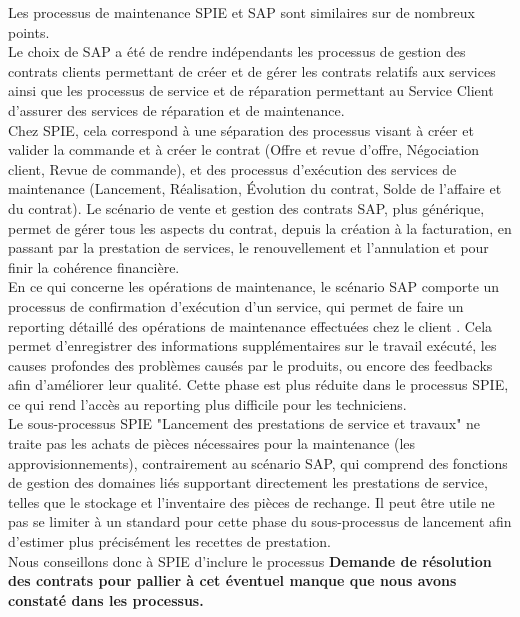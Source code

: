 Les processus de maintenance SPIE et SAP sont similaires sur de nombreux points. \\

Le choix de SAP a été de rendre indépendants les processus de gestion des contrats clients permettant de créer et de gérer les contrats relatifs aux services ainsi que les processus de service et de réparation permettant au Service Client d’assurer des services de réparation et de maintenance. \\

Chez SPIE, cela correspond à une séparation des processus visant à créer et valider la commande et à créer le contrat (Offre et revue d’offre, Négociation client, Revue de commande), et des processus d’exécution des services de maintenance (Lancement, Réalisation, Évolution du contrat, Solde de l’affaire et du contrat). Le scénario de vente et gestion des contrats SAP, plus générique, permet de gérer tous les aspects du contrat, depuis la création à la facturation, en passant par la prestation de services, le renouvellement et l’annulation et pour finir la cohérence financière. \\

En ce qui concerne les opérations de maintenance, le scénario SAP comporte un processus de confirmation d’exécution d’un service, qui permet de faire un reporting détaillé des opérations de maintenance effectuées chez le client . Cela permet d'enregistrer des informations supplémentaires sur le travail exécuté, les causes profondes des problèmes causés par le produits, ou encore des feedbacks afin d’améliorer leur qualité. Cette phase est plus réduite dans le processus SPIE, ce qui rend l’accès au reporting plus difficile pour les techniciens. \\

Le sous-processus SPIE "Lancement des prestations de service et travaux" ne traite pas les achats de pièces nécessaires pour la maintenance (les approvisionnements), contrairement au scénario SAP, qui comprend des fonctions de gestion des domaines liés supportant directement les prestations de service, telles que le stockage et l’inventaire des pièces de rechange. Il peut être utile ne pas se limiter à un standard pour cette phase du sous-processus de lancement afin d’estimer plus précisément les recettes de prestation. \\

Nous conseillons donc à SPIE d’inclure le processus \bf{Demande de résolution des contrats} pour pallier à cet éventuel manque que nous avons constaté dans les processus. \\

